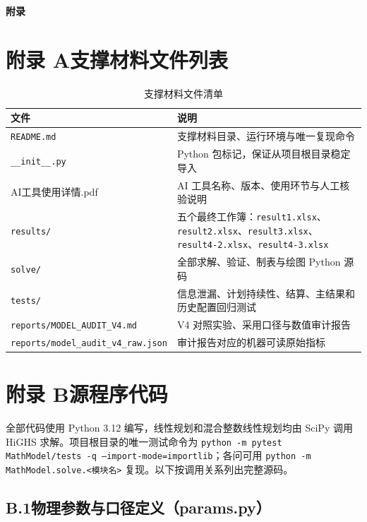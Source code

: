 \newpage
\appendix
\begin{center}
	{\bfseries 附录}
\end{center}

\section*{附录 A\quad 支撑材料文件列表}

\begin{table}[htbp]
	\caption{支撑材料文件清单}
	\centering
	\begin{tabularx}{0.96\textwidth}{l X}
		\toprule
		文件 & 说明 \\
		\midrule
		\texttt{README.md} & 支撑材料目录、运行环境与唯一复现命令 \\
		\texttt{\_\_init\_\_.py} & Python 包标记，保证从项目根目录稳定导入 \\
		AI工具使用详情.pdf & AI 工具名称、版本、使用环节与人工核验说明 \\
		\texttt{results/} & 五个最终工作簿：\texttt{result1.xlsx}、\texttt{result2.xlsx}、\texttt{result3.xlsx}、\texttt{result4-2.xlsx}、\texttt{result4-3.xlsx} \\
		\texttt{solve/} & 全部求解、验证、制表与绘图 Python 源码 \\
		\texttt{tests/} & 信息泄漏、计划持续性、结算、主结果和历史配置回归测试 \\
		\texttt{reports/MODEL\_AUDIT\_V4.md} & V4 对照实验、采用口径与数值审计报告 \\
		\texttt{reports/model\_audit\_v4\_raw.json} & 审计报告对应的机器可读原始指标 \\
		\bottomrule
	\end{tabularx}
\end{table}

\section*{附录 B\quad 源程序代码}

全部代码使用 Python 3.12 编写，线性规划和混合整数线性规划均由 SciPy 调用 HiGHS 求解。项目根目录的唯一测试命令为 \texttt{python -m pytest MathModel/tests -q --import-mode=importlib}；各问可用 \texttt{python -m MathModel.solve.<模块名>} 复现。以下按调用关系列出完整源码。

\subsection*{B.1\quad 物理参数与口径定义（params.py）}


